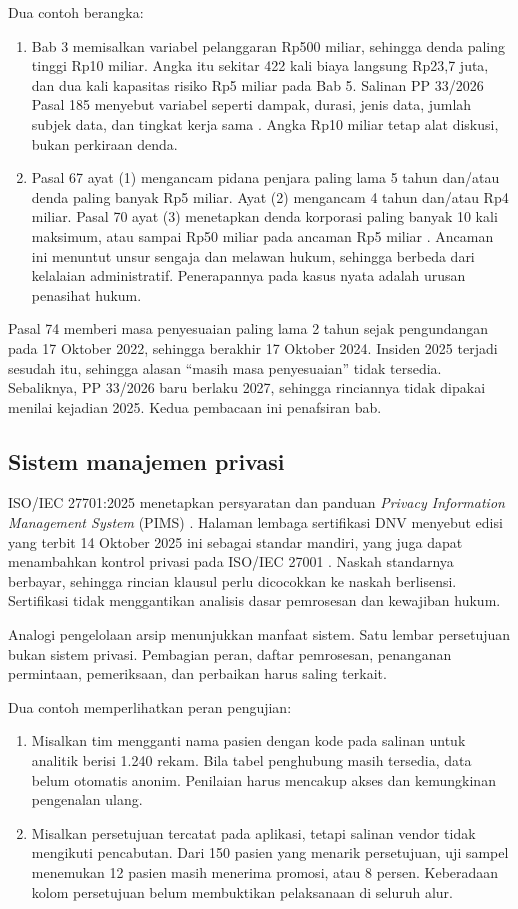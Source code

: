 Dua contoh berangka:
\begin{enumerate}
  \item Bab 3 memisalkan variabel pelanggaran Rp500 miliar, sehingga denda paling tinggi Rp10
  miliar. Angka itu sekitar 422 kali biaya langsung Rp23,7 juta, dan dua kali kapasitas risiko Rp5
  miliar pada Bab 5. Salinan PP 33/2026 Pasal 185 menyebut variabel seperti dampak, durasi, jenis
  data, jumlah subjek data, dan tingkat kerja sama \cite{c03-pp33-nonresmi}. Angka Rp10 miliar tetap
  alat diskusi, bukan perkiraan denda.
  \item Pasal 67 ayat (1) mengancam pidana penjara paling lama 5 tahun dan/atau denda paling banyak
  Rp5 miliar. Ayat (2) mengancam 4 tahun dan/atau Rp4 miliar. Pasal 70 ayat (3) menetapkan denda
  korporasi paling banyak 10 kali maksimum, atau sampai Rp50 miliar pada ancaman Rp5 miliar
  \cite{uu27-2022-pdp}. Ancaman ini menuntut unsur sengaja dan melawan hukum, sehingga berbeda dari
  kelalaian administratif. Penerapannya pada kasus nyata adalah urusan penasihat hukum.
\end{enumerate}

Pasal 74 memberi masa penyesuaian paling lama 2 tahun sejak pengundangan pada 17 Oktober 2022,
sehingga berakhir 17 Oktober 2024. Insiden 2025 terjadi sesudah itu, sehingga alasan ``masih masa
penyesuaian'' tidak tersedia. Sebaliknya, PP 33/2026 baru berlaku 2027, sehingga rinciannya tidak
dipakai menilai kejadian 2025. Kedua pembacaan ini penafsiran bab.

\subsection*{Sistem manajemen privasi}

ISO/IEC 27701:2025 menetapkan persyaratan dan panduan \textit{Privacy Information Management System}
(PIMS) \cite{c07-iso27701}. Halaman lembaga sertifikasi DNV menyebut edisi yang terbit 14 Oktober
2025 ini sebagai standar mandiri, yang juga dapat menambahkan kontrol privasi pada ISO/IEC 27001
\cite{c07-dnv-27701}. Naskah standarnya berbayar, sehingga rincian klausul perlu dicocokkan ke
naskah berlisensi. Sertifikasi tidak menggantikan analisis dasar pemrosesan dan kewajiban hukum.

Analogi pengelolaan arsip menunjukkan manfaat sistem. Satu lembar persetujuan bukan sistem privasi.
Pembagian peran, daftar pemrosesan, penanganan permintaan, pemeriksaan, dan perbaikan harus saling
terkait.

Dua contoh memperlihatkan peran pengujian:
\begin{enumerate}
  \item Misalkan tim mengganti nama pasien dengan kode pada salinan untuk analitik berisi 1.240
  rekam. Bila tabel penghubung masih tersedia, data belum otomatis anonim. Penilaian harus mencakup
  akses dan kemungkinan pengenalan ulang.
  \item Misalkan persetujuan tercatat pada aplikasi, tetapi salinan vendor tidak mengikuti
  pencabutan. Dari 150 pasien yang menarik persetujuan, uji sampel menemukan 12 pasien masih
  menerima promosi, atau 8 persen. Keberadaan kolom persetujuan belum membuktikan pelaksanaan di
  seluruh alur.
\end{enumerate}

